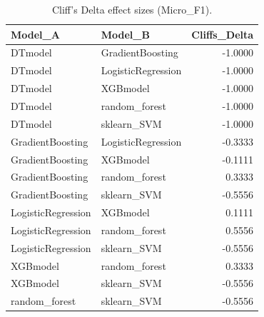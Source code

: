 \begin{table}[t]
\centering
\begin{tabular}{llr}
\toprule
Model_A & Model_B & Cliffs_Delta \\
\midrule
DTmodel & GradientBoosting & -1.0000 \\
DTmodel & LogisticRegression & -1.0000 \\
DTmodel & XGBmodel & -1.0000 \\
DTmodel & random_forest & -1.0000 \\
DTmodel & sklearn_SVM & -1.0000 \\
GradientBoosting & LogisticRegression & -0.3333 \\
GradientBoosting & XGBmodel & -0.1111 \\
GradientBoosting & random_forest & 0.3333 \\
GradientBoosting & sklearn_SVM & -0.5556 \\
LogisticRegression & XGBmodel & 0.1111 \\
LogisticRegression & random_forest & 0.5556 \\
LogisticRegression & sklearn_SVM & -0.5556 \\
XGBmodel & random_forest & 0.3333 \\
XGBmodel & sklearn_SVM & -0.5556 \\
random_forest & sklearn_SVM & -0.5556 \\
\bottomrule
\end{tabular}
\caption{Cliff's Delta effect sizes (Micro_F1).}
\label{tab:cliffs_Micro_F1}
\end{table}